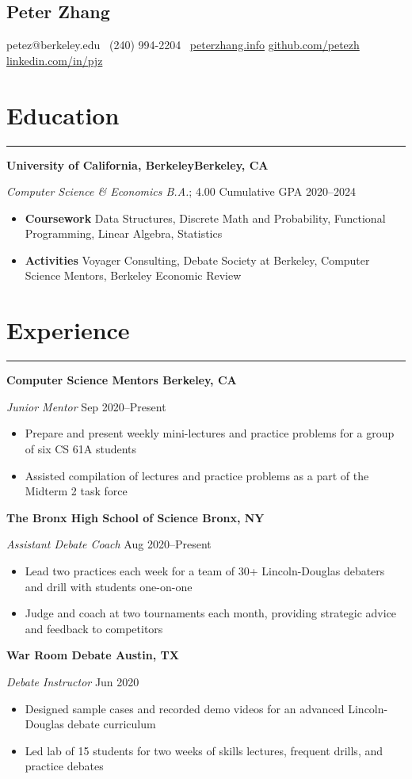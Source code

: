 \documentclass[11pt]{article}
\newcommand{\name}[1]{\begin{center}\section*{\huge \color{highlight} #1}\end{center}}
\newcommand{\topinfo}[1]{\begin{center}\vspace{-0.2cm}#1\vspace{-0.2cm}\end{center}}
\newcommand{\resumesection}[1]{\vspace{-0.3cm}\section*{\color{highlight}#1}\vspace{-0.3cm}\hrule\vspace{0.3cm}}
\begin{document}
\name{Peter Zhang}
\topinfo{petez@berkeley.edu \textbullet\ (240) 994-2204 \textbullet\ \href{https://peterzhang.info/}{peterzhang.info} \textbullet  \href{https://github.com/petezh}{github.com/petezh}  \textbullet  \href{https://www.linkedin.com/in/pjz/}{linkedin.com/in/pjz}}

\resumesection{Education}

\textbf{University of California, Berkeley\hfill Berkeley, CA} \par
\textit{Computer Science \& Economics B.A.}; 4.00 Cumulative GPA \hfill 2020--2024
\begin{itemize}
	\item \textbf{Coursework} Data Structures, Discrete Math and Probability, Functional Programming, Linear Algebra, Statistics
	\item \textbf{Activities} Voyager Consulting, Debate Society at Berkeley, Computer Science Mentors, Berkeley Economic Review
\end{itemize}

\resumesection{Experience}

\textbf{Computer Science Mentors \hfill Berkeley, CA} \par
\textit{Junior Mentor} \hfill Sep 2020--Present \par
\begin{itemize}
	\item Prepare and present weekly mini-lectures and practice problems for a group of six CS 61A students
	\item Assisted compilation of lectures and practice problems as a part of the Midterm 2 task force
\end{itemize}\vspace{0.1cm}

\textbf{The Bronx High School of Science \hfill Bronx, NY} \par
\textit{Assistant Debate Coach}  \hfill Aug 2020--Present
\begin{itemize}
	\item Lead two practices each week for a team of 30+ Lincoln-Douglas debaters and drill with students one-on-one
	\item Judge and coach at two tournaments each month, providing strategic advice and feedback to competitors
\end{itemize}\vspace{0.1cm}

\textbf{War Room Debate \hfill Austin, TX} \par
\textit{Debate Instructor}  \hfill Jun 2020 \par
\begin{itemize}
	\item Designed sample cases and recorded demo videos for an advanced Lincoln-Douglas debate curriculum
	\item Led lab of 15 students for two weeks of skills lectures, frequent drills, and practice debates
\end{itemize}\vspace{0.1cm}
\end{document}
